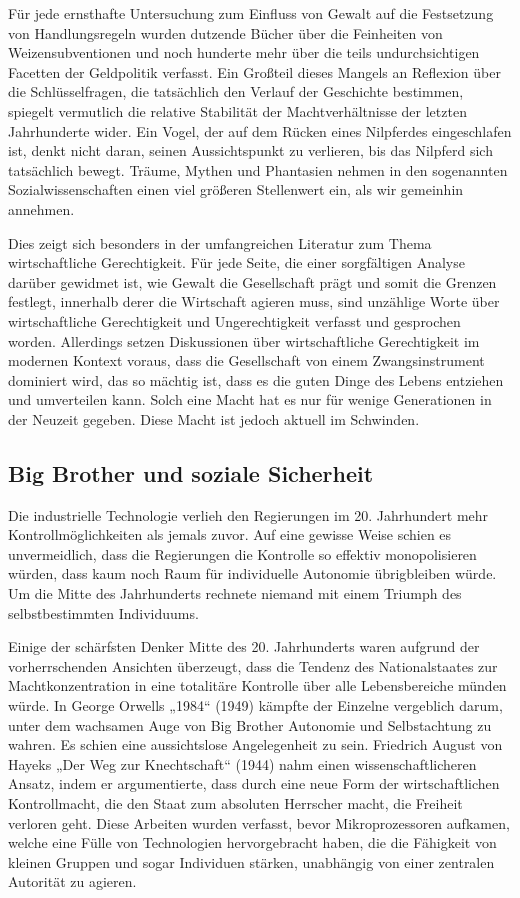\documentclass[
  a5paper,
  smalldemyvopaper,10pt,twoside,onecolumn,openright,extrafontsizes,hidelinks]{memoir}
\begin{document}
Für jede ernsthafte Untersuchung zum Einfluss von Gewalt auf die
Festsetzung von Handlungsregeln wurden dutzende Bücher über die
Feinheiten von Weizensubventionen und noch hunderte mehr über die teils
undurchsichtigen Facetten der Geldpolitik verfasst. Ein Großteil dieses
Mangels an Reflexion über die Schlüsselfragen, die tatsächlich den
Verlauf der Geschichte bestimmen, spiegelt vermutlich die relative
Stabilität der Machtverhältnisse der letzten Jahrhunderte wider. Ein
Vogel, der auf dem Rücken eines Nilpferdes eingeschlafen ist, denkt
nicht daran, seinen Aussichtspunkt zu verlieren, bis das Nilpferd sich
tatsächlich bewegt. Träume, Mythen und Phantasien nehmen in den
sogenannten Sozialwissenschaften einen viel größeren Stellenwert ein,
als wir gemeinhin annehmen.

Dies zeigt sich besonders in der umfangreichen Literatur zum Thema
wirtschaftliche Gerechtigkeit. Für jede Seite, die einer sorgfältigen
Analyse darüber gewidmet ist, wie Gewalt die Gesellschaft prägt und
somit die Grenzen festlegt, innerhalb derer die Wirtschaft agieren muss,
sind unzählige Worte über wirtschaftliche Gerechtigkeit und
Ungerechtigkeit verfasst und gesprochen worden. Allerdings setzen
Diskussionen über wirtschaftliche Gerechtigkeit im modernen Kontext
voraus, dass die Gesellschaft von einem Zwangsinstrument dominiert wird,
das so mächtig ist, dass es die guten Dinge des Lebens entziehen und
umverteilen kann. Solch eine Macht hat es nur für wenige Generationen in
der Neuzeit gegeben. Diese Macht ist jedoch aktuell im Schwinden.

\subsection{Big Brother und soziale
Sicherheit}\label{big-brother-und-soziale-sicherheit}

Die industrielle Technologie verlieh den Regierungen im 20. Jahrhundert
mehr Kontrollmöglichkeiten als jemals zuvor. Auf eine gewisse Weise
schien es unvermeidlich, dass die Regierungen die Kontrolle so effektiv
monopolisieren würden, dass kaum noch Raum für individuelle Autonomie
übrigbleiben würde. Um die Mitte des Jahrhunderts rechnete niemand mit
einem Triumph des selbstbestimmten Individuums.

Einige der schärfsten Denker Mitte des 20. Jahrhunderts waren aufgrund
der vorherrschenden Ansichten überzeugt, dass die Tendenz des
Nationalstaates zur Machtkonzentration in eine totalitäre Kontrolle über
alle Lebensbereiche münden würde. In George Orwells „1984`` (1949)
kämpfte der Einzelne vergeblich darum, unter dem wachsamen Auge von Big
Brother Autonomie und Selbstachtung zu wahren. Es schien eine
aussichtslose Angelegenheit zu sein. Friedrich August von Hayeks „Der
Weg zur Knechtschaft`` (1944) nahm einen wissenschaftlicheren Ansatz,
indem er argumentierte, dass durch eine neue Form der wirtschaftlichen
Kontrollmacht, die den Staat zum absoluten Herrscher macht, die Freiheit
verloren geht. Diese Arbeiten wurden verfasst, bevor Mikroprozessoren
aufkamen, welche eine Fülle von Technologien hervorgebracht haben, die
die Fähigkeit von kleinen Gruppen und sogar Individuen stärken,
unabhängig von einer zentralen Autorität zu agieren.
\end{document}
